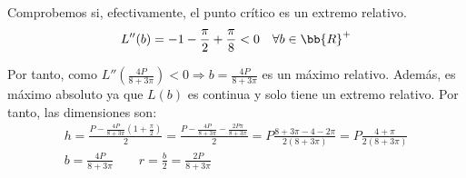 \begin{ejercicio}
    Comprobemos si, efectivamente, el punto crítico es un extremo relativo.
    \begin{equation*}
        L''(b) = -1 - \frac{\pi}{2} + \frac{\pi}{8} < 0 \quad \forall b \in \bb{R}^+
    \end{equation*}

    Por tanto, como $L''\left(\frac{4 P}{8+3\pi} \right) < 0 \Longrightarrow b = \frac{4 P}{8+3\pi}$ es un máximo relativo. Además, es máximo absoluto ya que $L(b)$ es continua y solo tiene un extremo relativo. Por tanto, las dimensiones son:
    \begin{gather*}
        h = \frac{P-\frac{4 P}{8+3\pi}\left(1+\frac{\pi}{2}\right)}{2}
        =\frac{P-\frac{4 P}{8+3\pi}-\frac{2 P\pi}{8+3\pi}}{2}
        = P\frac{8+3\pi-4-2\pi}{2(8+3\pi)}
        = P\frac{4+\pi}{2(8+3\pi)}\\
        b=\frac{4 P}{8+3\pi} \qquad r=\frac{b}{2} = \frac{2P}{8+3\pi}
    \end{gather*}
    
\end{ejercicio}

